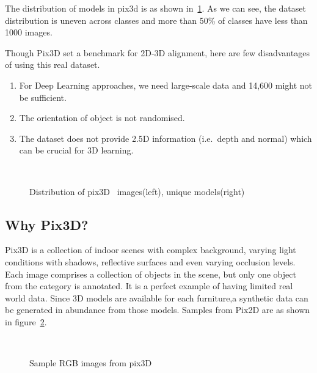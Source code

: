 The distribution of models in pix3d is as shown in~\ref{fig:pix3d_histogram}.
As we can see, the dataset distribution is uneven across classes and more than 50\% of classes have less than 1000 images.

Though Pix3D set a benchmark for 2D-3D alignment, here are few disadvantages of using this real dataset.
\begin{enumerate}
    \item For Deep Learning approaches, we need large-scale data and 14,600 might not be sufficient.
    \item The orientation of object is not randomised.
    \item The dataset does not provide 2.5D information (i.e.\ depth and normal) which can be crucial for 3D learning.
\end{enumerate}

\begin{figure}[!ht]
    \centering
    \quad
    \\
    \caption{Distribution of pix3D~\cite{pix3d} images(left), unique models(right)}
    \label{fig:pix3d_histogram}
\end{figure}

\subsection{Why Pix3D?}\label{subsec:why-pix3d?}
Pix3D is a collection of indoor scenes with complex background, varying light conditions with shadows, reflective surfaces and even varying occlusion levels.
Each image comprises a collection of objects in the scene, but only one object from the category is annotated.
It is a perfect example of having limited real world data.
Since 3D models are available for each furniture,a synthetic data can be generated in abundance from those models.
Samples from Pix2D are as shown in figure~\ref{fig:Pix3D samples}.

\begin{figure}[!ht]
    \centering
    \quad
    \\
    \quad
    \caption{Sample RGB images from pix3D}
    \label{fig:Pix3D samples}
\end{figure}

